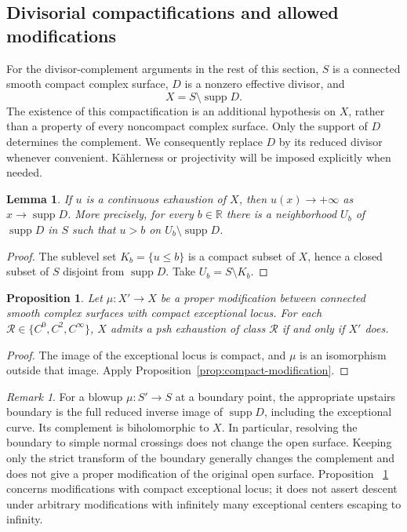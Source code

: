 \documentclass[11pt]{amsart}
\newtheorem{proposition}[theorem]{Proposition}
\newtheorem{lemma}[theorem]{Lemma}
\theoremstyle{definition}
\theoremstyle{remark}
\newtheorem{remark}[theorem]{Remark}
\numberwithin{equation}{section}
\newcommand{\R}{\mathbb R}
\newcommand{\supp}{\operatorname{supp}}
\begin{document}
\subsection{Divisorial compactifications and allowed modifications}
\label{sec:surface-pair-reduction}

For the divisor-complement arguments in the rest of this section,
$S$ is a connected smooth compact complex surface, $D$ is a nonzero
effective divisor, and
\[
 X=S\setminus\supp D.
\]
The existence of this compactification is an additional hypothesis on
$X$, rather than a property of every noncompact complex surface.  Only
the support of $D$ determines the complement.  We consequently replace
$D$ by its reduced divisor whenever convenient. K\"ahlerness or
projectivity will be imposed explicitly when needed.

\begin{lemma}\label{lem:surface-boundary-divergence}
If $u$ is a continuous exhaustion of $X$, then $u(x)\to+\infty$ as
$x\to\supp D$.  More precisely, for every $b\in\R$ there is a neighborhood
$U_b$ of $\supp D$ in $S$ such that $u>b$ on $U_b\setminus\supp D$.
\end{lemma}
\begin{proof}
The sublevel set $K_b=\{u\le b\}$ is a compact subset of $X$, hence a
closed subset of $S$ disjoint from $\supp D$.  Take $U_b=S\setminus K_b$.
\end{proof}

\begin{proposition}\label{prop:surface-finite-modifications}
Let $\mu:X'\to X$ be a proper modification between connected smooth
complex surfaces with compact exceptional locus. For each
$\mathcal R\in\{C^0,C^2,C^\infty\}$, $X$ admits a psh exhaustion of
class $\mathcal R$ if and only if $X'$ does.
\end{proposition}
\begin{proof}
The image of the exceptional locus is compact, and $\mu$ is an
isomorphism outside that image. Apply
Proposition~\ref{prop:compact-modification}.
\end{proof}

\begin{remark}\label{rem:surface-boundary-transforms}
For a blowup $\mu:S'\to S$ at a boundary point, the appropriate upstairs
boundary is the full reduced inverse image of $\supp D$, including the
exceptional curve.  Its complement is biholomorphic to $X$.  In
particular, resolving the boundary to simple normal crossings does not
change the open surface.  Keeping only the strict transform of the
boundary generally changes the complement and does not give a proper
modification of the original open surface.  Proposition~
\ref{prop:surface-finite-modifications} concerns modifications with
compact exceptional locus; it does not assert descent under arbitrary
modifications with infinitely many exceptional centers escaping to
infinity.
\end{remark}
\end{document}
